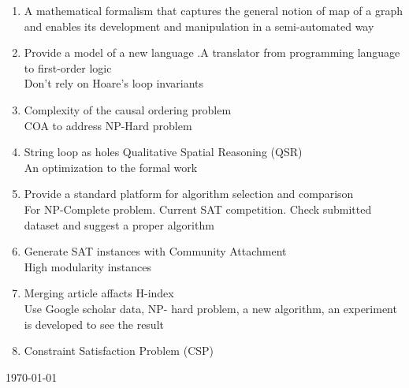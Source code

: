 \documentclass[a4paper,12pt]{article}
\begin{document}
\begin{enumerate}
	\item A  mathematical formalism that captures the general notion of map of a graph and enables its development and manipulation in a semi-automated way\cite{Fionda_Building_2016}
	
	\item Provide a model of a new language .A translator from programming language to first-order logic\cite{Lin_A_2016}	
	\\Don't rely on Hoare’s  loop  invariants

	\item Complexity of the causal ordering problem\cite{Gonalves_A_2016}
	\\ COA to address NP-Hard problem

	\item String loop as holes Qualitative Spatial Reasoning   (QSR)\cite{Cabalar_A_2016}
	\\An optimization to the formal work 

	\item Provide a standard platform for algorithm selection and comparison \cite{Bischl_ASlib_2016}
	\\ For NP-Complete problem. Current SAT competition. Check submitted dataset and suggest a proper algorithm

	\item Generate SAT instances with Community Attachment\cite{Girldez-Cru_Generating_2016}
	\\ High modularity instances

	\item  Merging article affacts H-index\cite{Bevern_H_2016}
	\\ Use Google scholar data, NP- hard problem, a new algorithm, an experiment is developed to see the result

	\item Constraint  Satisfaction  Problem  (CSP)\cite{Veksler_Learning_2016}
	

 
 




\end{enumerate}
\today




\end{document}
